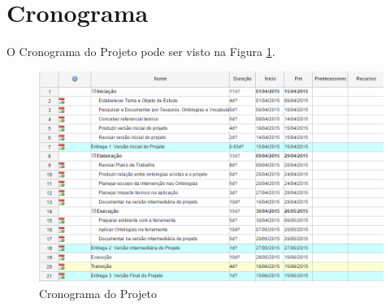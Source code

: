 \section{Cronograma}

O Cronograma do Projeto pode ser visto na Figura \ref{fig:cronograma}.

\graphicspath{{figuras/}}

\begin{figure}[!htb]
 \centering
 \includegraphics[scale = 0.5]{cronograma}
 \caption{Cronograma do Projeto}
 \label{fig:cronograma}
\end{figure}